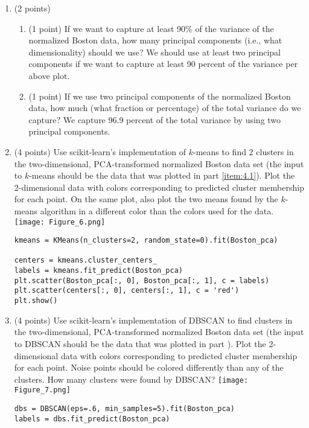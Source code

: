 \documentclass[11pt]{article}
\begin{document}
\begin{enumerate}
\begin{enumerate}
        \item (2 points)
        \begin{enumerate}

            \item (1 point) If we want to capture at least 90\% of the variance
            of the normalized Boston data, how many principal components (i.e.,
            what dimensionality) should we use?
            \newline We should use at least two principal components if we want to capture at least 90 percent of the variance per above plot.
            

            \item (1 point) If we use two principal components of the normalized
            Boston data, how much (what fraction or percentage) of the total
            variance do we capture?
            \newline We capture 96.9 percent of the total variance by using two principal components.

        \end{enumerate}

        \item (4 points) Use scikit-learn's implementation of $k$-means to find
        2 clusters in the two-dimensional, PCA-transformed normalized Boston
        data set (the input to $k$-means should be the data that was plotted in
        part \ref{item:4.1}). Plot the 2-dimensional data with colors corresponding to
        predicted cluster membership for each point. On the same plot, also plot
        the two means found by the $k$-means algorithm in a different color than
        the colors used for the data.
        \newline \texttt{[image: Figure\_6.png]}
        \newline \begin{verbatim}
kmeans = KMeans(n_clusters=2, random_state=0).fit(Boston_pca)

centers = kmeans.cluster_centers_
labels = kmeans.fit_predict(Boston_pca)
plt.scatter(Boston_pca[:, 0], Boston_pca[:, 1], c = labels)
plt.scatter(centers[:, 0], centers[:, 1], c = 'red')
plt.show()
        \end{verbatim}
        \newpage
        \item (4 points) Use scikit-learn's implementation of DBSCAN to find
        clusters in the two-dimensional, PCA-transformed normalized Boston data
        set (the input to DBSCAN should be the data that was plotted in part
        \label{item:4.1}). Plot the 2-dimensional data with colors corresponding
        to predicted cluster membership for each point. Noise points should be
        colored differently than any of the clusters. How many clusters were
        found by DBSCAN?
        \newline \texttt{[image: Figure\_7.png]} 
        \newline \begin{verbatim}
dbs = DBSCAN(eps=.6, min_samples=5).fit(Boston_pca)
labels = dbs.fit_predict(Boston_pca)


\end{verbatim}
\end{enumerate}
\end{enumerate}
\end{document}
